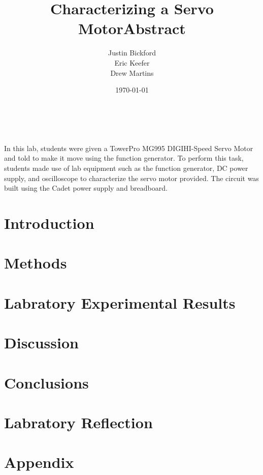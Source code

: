 \documentclass[11pt]{article}
\title{Characterizing a Servo Motor}
\author{Justin Bickford\\Eric Keefer\\Drew Martins}
\date{\today}
\begin{document}
\maketitle
\pagebreak
\tableofcontents
\pagebreak

\begin{center}
\title{Abstract}
\end{center}
\\ \\
In this lab, students were given a TowerPro MG995 DIGIHI-Speed Servo Motor and told to make it move using the function generator. To perform this task, students made use of lab equipment such as the function generator, DC power supply, and oscilloscope to characterize the servo motor provided. The circuit was built using the Cadet power supply and breadboard.

\section{Introduction}

\section{Methods}

\section{Labratory Experimental Results}

\section{Discussion}

\section{Conclusions}

\section{Labratory Reflection}

\section{Appendix}
\end{document}
